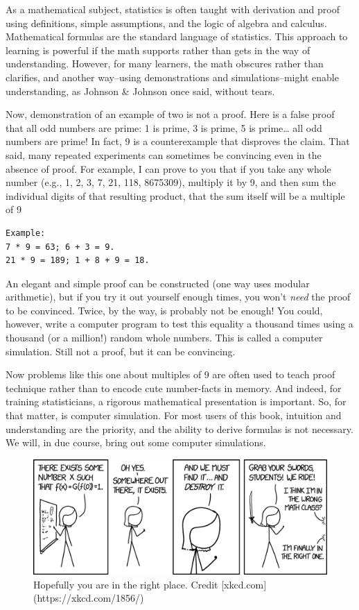 \documentclass[
  openany]{book}
\begin{document}
As a mathematical subject, statistics is often taught with derivation and proof using definitions, simple assumptions, and the logic of algebra and calculus. Mathematical formulas are the standard language of statistics. This approach to learning is powerful if the math supports rather than gets in the way of understanding. However, for many learners, the math obscures rather than clarifies, and another way--using demonstrations and simulations--might enable understanding, as Johnson \& Johnson once said, without tears.

Now, demonstration of an example of two is not a proof. Here is a false proof that all odd numbers are prime: 1 is prime, 3 is prime, 5 is prime\ldots{} all odd numbers are prime! In fact, 9 is a counterexample that disproves the claim. That said, many repeated experiments can sometimes be convincing even in the absence of proof. For example, I can prove to you that if you take any whole number (e.g., 1, 2, 3, 7, 21, 118, 8675309), multiply it by 9, and then sum the individual digits of that resulting product, that the sum itself will be a multiple of 9

\begin{verbatim}
Example: 
7 * 9 = 63; 6 + 3 = 9.
21 * 9 = 189; 1 + 8 + 9 = 18. 
\end{verbatim}

An elegant and simple proof can be constructed (one way uses modular arithmetic), but if you try it out yourself enough times, you won't \emph{need} the proof to be convinced. Twice, by the way, is probably not be enough! You could, however, write a computer program to test this equality a thousand times using a thousand (or a million!) random whole numbers. This is called a computer simulation. Still not a proof, but it can be convincing.

Now problems like this one about multiples of 9 are often used to teach proof technique rather than to encode cute number-facts in memory. And indeed, for training statisticians, a rigorous mathematical presentation is important. So, for that matter, is computer simulation. For most users of this book, intuition and understanding are the priority, and the ability to derive formulas is not necessary. We will, in due course, bring out some computer simulations.

\begin{figure}

{\centering \includegraphics[width=0.9\linewidth]{images/existence_proof_2x} 

}

\caption{Hopefully you are in the right place. Credit   [xkcd.com](https://xkcd.com/1856/)}\label{fig:xkcd-preamble}
\end{figure}
\end{document}
